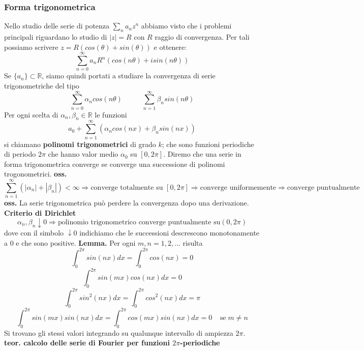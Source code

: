 \subsubsection{Forma trigonometrica}
Nello studio delle serie di potenza $\sum_{n}a_n z^n$ abbiamo visto che i problemi principali riguardano lo studio di $|z| = R$ con $R$ raggio di convergenza. Per tali possiamo scrivere $z = R(cos(\theta) + sin(\theta))$ e ottenere:
\[
    \sum_{n=0}^{\infty} a_n R^n(cos(n \theta) + isin(n \theta))
\]
Se $\{a_n\} \subset \mathbb{R}$, siamo quindi portati a studiare la convergenza di serie trigonometriche del tipo
\[
    \sum_{n=0}^{\infty} \alpha_n cos(n \theta) \;\;\;\;\; \;\;\;\;\; \sum_{n=1}^{\infty} \beta_n sin(n \theta)
\]
Per ogni scelta di $\alpha_n, \beta_n \in \mathbb{R}$ le funzioni
\[
    a_0 + \sum_{n=1}^{\infty} (\alpha_n cos(nx) + \beta_n sin(n x))
\]
si chiamano \textbf{polinomi trigonometrici} di grado $k$; che sono funzioni periodiche di periodo $2\pi$ che hanno valor medio $\alpha_0$ su $[0, 2\pi]$.\newline
Diremo che una serie in forma trigonometrica converge se converge una successione di polinomi trogonometrici.\newline
\textbf{oss.} 
\[
    \sum_{n=1}^{\infty} (|\alpha_n| + |\beta_n|) < \infty \Rightarrow \text{converge totalmente su } [0,2\pi] \Rightarrow \text{converge uniformemente} \Rightarrow \text{converge puntualmente}
\]
\textbf{oss.} La serie trigonometrica può perdere la convergenza dopo una derivazione.\newline
\newline
\textbf{Criterio di Dirichlet}
\[
    \alpha_n, \beta_n \downarrow 0 \Rightarrow \text{polinomio trigonometrico converge puntualmente su} (0,2\pi)
\]
dove con il simbolo $\downarrow 0$ indichiamo che le successioni descrescono monotonamente a $0$ e che sono positive.\newline
\newline
\textbf{Lemma.} Per ogni $m,n = 1,2,\dots$ risulta 
\[
    \int_{0}^{2\pi} sin(nx) dx = \int_{0}^{2\pi} cos(nx) = 0
\]
\[
    \int_{0}^{2\pi} sin(mx) cos(nx) dx = 0
\]
\[
    \int_{0}^{2\pi} sin^2(nx) dx = \int_{0}^{2\pi} cos^2(nx) dx = \pi
\]
\[
    \int_{0}^{2\pi} sin(mx) sin(nx) dx = \int_{0}^{2\pi} cos(mx) sin(nx) dx = 0 \;\;\;\; \text{se} \; m\neq n
\]
Si trovano gli stessi valori integrando su qualunque intervallo di ampiezza $2\pi$.\newline
\newline
\textbf{teor. calcolo delle serie di Fourier per funzioni $2\pi$-periodiche} 

